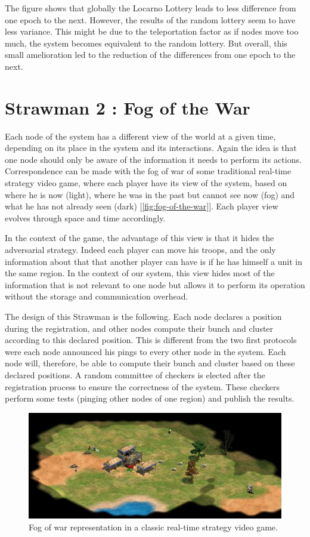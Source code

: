\documentclass[a4paper,11pt,twoside=semi,openright]{report}
\begin{document}
The figure shows that globally the Locarno Lottery leads to less difference
from one epoch to the next. However, the results of the random lottery seem to
have less variance. This might be due to the teleportation factor as if nodes
move too much, the system becomes equivalent to the random lottery. But
overall, this small amelioration led to the reduction of the differences from
one epoch to the next.

\section{Strawman 2 : Fog of the War} \label{sec:Fog-of-the-war}

Each node of the system has a different view of the world at a given time,
depending on its place in the system and its interactions. Again the idea is
that one node should only be aware of the information it needs to perform its
actions. Correspondence can be made with the fog of war of some traditional
real-time strategy video game, where each player have its view of the system,
based on where he is now (light), where he was in the past but cannot see now
(fog) and what he has not already seen (dark) [\autoref{fig:fog-of-the-war}].
Each player view evolves through space and time accordingly.

In the context of the game, the advantage of this view is that it hides the
adversarial strategy. Indeed each player can move his troops, and the only
information about that that another player can have is if he has himself a unit
in the same region. In the context of our system, this view
hides most of the information that is not relevant to one node but allows it
to perform its operation without the storage and communication overhead. 

The design of this Strawman is the following. Each node declares a position
during the registration, and other nodes compute their bunch and cluster
according to this declared position. This is different from the two first
protocols were each node announced his pings to every other node in the system.
Each node will, therefore, be able to compute their bunch and cluster based on
these declared positions. A random committee of checkers is elected after the
registration process to ensure the correctness of the system. These checkers
perform some tests (pinging other nodes of one region) and publish the results. 

\begin{figure}[!h] 
\centering
\includegraphics[width=400pt]{figures/fog_of_war}
\caption{Fog of war representation in a classic real-time strategy video game. \cite{ageofempire1999} }
\label{fig:fog-of-the-war}
\end{figure}
\end{document}
